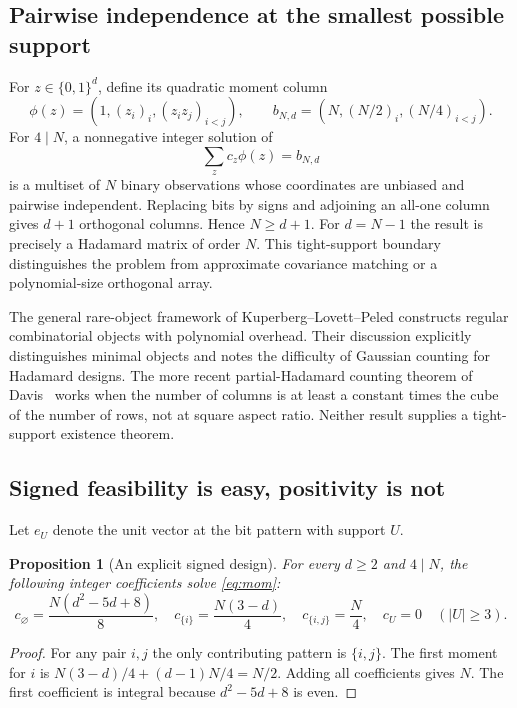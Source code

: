 \documentclass[11pt]{article}
\newtheorem{proposition}{Proposition}[section]
\begin{document}
\subsection{Pairwise independence at the smallest possible support}
For $z\in\{0,1\}^d$, define its quadratic moment column
\[
 \phi(z)=(1,(z_i)_i,(z_iz_j)_{i<j}),\qquad
 b_{N,d}=(N,(N/2)_i,(N/4)_{i<j}).
\]
For $4\mid N$, a nonnegative integer solution of
\begin{equation}\label{eq:mom}
 \sum_z c_z\phi(z)=b_{N,d}
\end{equation}
is a multiset of $N$ binary observations whose coordinates are unbiased
and pairwise independent. Replacing bits by signs and adjoining an
all-one column gives $d+1$ orthogonal columns. Hence $N\ge d+1$.
For $d=N-1$ the result is precisely a Hadamard matrix of order $N$.
This tight-support boundary distinguishes the problem from approximate
covariance matching or a polynomial-size orthogonal array.

The general rare-object framework of Kuperberg--Lovett--Peled
\cite{KLP} constructs regular combinatorial objects with polynomial
overhead. Their discussion explicitly distinguishes minimal objects
and notes the difficulty of Gaussian counting for Hadamard designs.
The more recent partial-Hadamard counting theorem of Davis~\cite{Davis}
works when the number of columns is at least a constant times the cube
of the number of rows, not at square aspect ratio. Neither result
supplies a tight-support existence theorem.

\subsection{Signed feasibility is easy, positivity is not}
Let $e_U$ denote the unit vector at the bit pattern with support $U$.
\begin{proposition}[An explicit signed design]\label{prop:signed}
For every $d\ge2$ and $4\mid N$, the following integer coefficients
solve \eqref{eq:mom}:
\[
 c_\varnothing=\frac{N(d^2-5d+8)}8,\quad
 c_{\{i\}}=\frac{N(3-d)}4,\quad
 c_{\{i,j\}}=\frac N4,\quad
 c_U=0\quad(|U|\ge3).
\]
\end{proposition}
\begin{proof}
For any pair $i,j$ the only contributing pattern is $\{i,j\}$.
The first moment for $i$ is $N(3-d)/4+(d-1)N/4=N/2$.
Adding all coefficients gives $N$. The first coefficient is integral
because $d^2-5d+8$ is even.
\end{proof}
\end{document}
